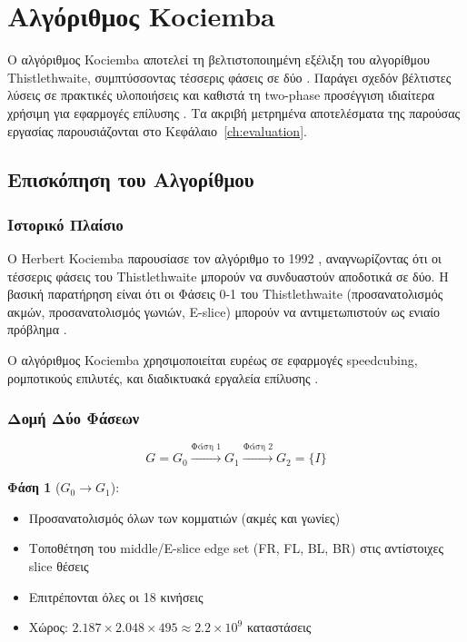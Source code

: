 
\chapter{Αλγόριθμος Kociemba}
\label{ch:kociemba}

Ο αλγόριθμος Kociemba αποτελεί τη βελτιστοποιημένη εξέλιξη του αλγορίθμου Thistlethwaite, συμπτύσσοντας τέσσερις φάσεις σε δύο \cite{kociemba1992close,kociemba_twophase_details}. Παράγει σχεδόν βέλτιστες λύσεις σε πρακτικές υλοποιήσεις και καθιστά τη two-phase προσέγγιση ιδιαίτερα χρήσιμη για εφαρμογές επίλυσης \cite{kociemba_moves20,kociemba_website}. Τα ακριβή μετρημένα αποτελέσματα της παρούσας εργασίας παρουσιάζονται στο Κεφάλαιο~\ref{ch:evaluation}.


\section{Επισκόπηση του Αλγορίθμου}
\label{sec:kociemba_overview}

\subsection{Ιστορικό Πλαίσιο}

Ο Herbert Kociemba παρουσίασε τον αλγόριθμο το 1992 \cite{kociemba1992close}, αναγνωρίζοντας ότι οι τέσσερις φάσεις του Thistlethwaite μπορούν να συνδυαστούν αποδοτικά σε δύο. Η βασική παρατήρηση είναι ότι οι Φάσεις 0-1 του Thistlethwaite (προσανατολισμός ακμών, προσανατολισμός γωνιών, E-slice) μπορούν να αντιμετωπιστούν ως ενιαίο πρόβλημα \cite{kociemba_twophase_details}.

Ο αλγόριθμος Kociemba χρησιμοποιείται ευρέως σε εφαρμογές speedcubing, ρομποτικούς επιλυτές, και διαδικτυακά εργαλεία επίλυσης \cite{kociemba_website}.

\subsection{Δομή Δύο Φάσεων}

\begin{equation}
    G = G_0 \xrightarrow{\text{Φάση 1}} G_1 \xrightarrow{\text{Φάση 2}} G_2 = \{I\}
\end{equation}

\textbf{Φάση 1} ($G_0 \to G_1$):
\begin{itemize}
    \item Προσανατολισμός όλων των κομματιών (ακμές και γωνίες)
    \item Τοποθέτηση του middle/E-slice edge set (FR, FL, BL, BR) στις αντίστοιχες slice θέσεις
    \item Επιτρέπονται όλες οι 18 κινήσεις
    \item Χώρος: $2.187 \times 2.048 \times 495 \approx 2.2 \times 10^9$ καταστάσεις
\end{itemize}

